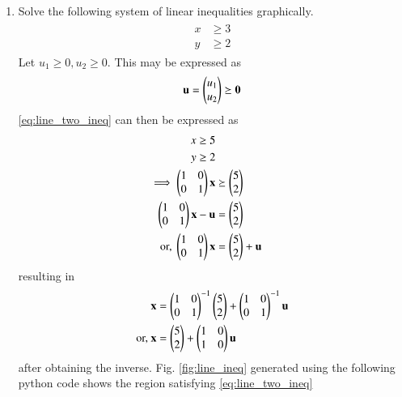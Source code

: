 \renewcommand{\theequation}{\theenumi}
\begin{enumerate}[label=\arabic*.,ref=\thesubsubsection.\theenumi]
\item Solve the following system of linear inequalities graphically.
\begin{align}
\label{eq:line_two_ineq}
\begin{split}
    x &\geq 3
\\
    y &\geq 2
\end{split}
\end{align}
Let $u_1 \ge 0, u_2 \ge 0$.  This may be expressed as
\begin{align}
\mathbf{u} = \begin{pmatrix}u_1\\u_2\end{pmatrix}\succeq \mathbf{0}
\end{align}
%
\eqref{eq:line_two_ineq} can then be expressed as
\begin{align}
\begin{split}
    x &\geq 5
\\
    y &\geq 2
\end{split}
%
\\
\implies 
\myvec{1 & 0 \\ 0 & 1}\vec{x}  &\succeq \myvec{5\\2}
\\
\myvec{1 & 0 \\ 0 & 1}\vec{x}  -\vec{u}&=\myvec{5\\2}
\\
\text{or, }
\myvec{1 & 0 \\ 0 & 1}\vec{x} &= \myvec{5\\2} +\vec{u}
\end{align}
%
resulting in 
\begin{align}
\mathbf{x} &= \begin{pmatrix}1 & 0 \\ 0 & 1\end{pmatrix}^{-1}\begin{pmatrix}5\\2\end{pmatrix} +\begin{pmatrix}1 & 0 \\ 0 & 1\end{pmatrix}^{-1}\mathbf{u}
\\
\text{or, } \mathbf{x} &= \begin{pmatrix}5\\2\end{pmatrix} +\begin{pmatrix}1 & 0 \\ 1 & 0\end{pmatrix}\mathbf{u}
\end{align}
%
after obtaining the  inverse.
%
 Fig. \ref{fig:line_ineq} generated using the following python code shows the region satisfying \eqref{eq:line_two_ineq}


\end{enumerate}
